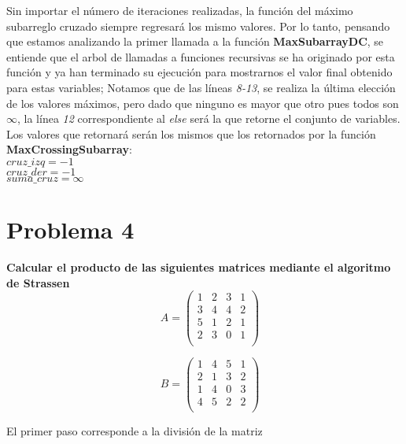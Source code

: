     Sin importar el número de iteraciones realizadas, la función del máximo subarreglo cruzado siempre regresará los mismo valores. Por lo tanto, pensando que estamos analizando la primer llamada a la función \textbf{MaxSubarrayDC}, se entiende que el arbol de llamadas a funciones recursivas se ha originado por esta función y ya han terminado su ejecución para mostrarnos el valor final obtenido para estas variables; Notamos que de las líneas \textit{8-13}, se realiza la última elección de los valores máximos, pero dado que ninguno es mayor que otro pues todos son $\infty$, la línea \textit{12} correspondiente al \textit{else} será la que retorne el conjunto de variables.\\
    
    Los valores que retornará serán los mismos que los retornados por la función \textbf{MaxCrossingSubarray}:\\
    \hfill \break
    $cruz\_izq = -1$\\
    $cruz\_der = -1$\\
    $suma\_cruz = \infty$\\
    
\section*{Problema 4}
    \textbf{Calcular el producto de las siguientes matrices mediante el algoritmo de Strassen}\\
    
    \begin{equation*}
        \quad A=
        \begin{pmatrix}
            1 & 2 & 3 & 1 \\
            3 & 4 & 4 & 2 \\
            5 & 1 & 2 & 1 \\
            2 & 3 & 0 & 1 \\
        \end{pmatrix}
    \end{equation*}
    
    \begin{equation*}
        \quad B=
        \begin{pmatrix}
            1 & 4 & 5 & 1 \\
            2 & 1 & 3 & 2 \\
            1 & 4 & 0 & 3\\
            4 & 5 & 2 & 2 \\
        \end{pmatrix}
    \end{equation*}
    
    El primer paso corresponde a la división de la matriz